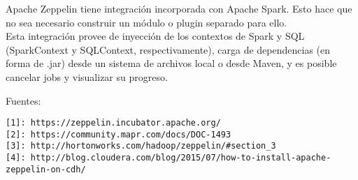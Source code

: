\documentclass[12pt,a4paper,twoside,openright,titlepage,final]{article}
\begin{document}
Apache Zeppelin tiene integración incorporada con Apache Spark. Esto hace que no sea necesario construir un módulo o plugin separado para ello.\\
Esta integración provee de inyección de los contextos de Spark y SQL (SparkContext y SQLContext, respectivamente), carga de dependencias (en forma de .jar) desde un sistema de archivos local o desde Maven, y es posible cancelar jobs y visualizar su progreso. 

Fuentes:\\
\begin{verbatim}
[1]: https://zeppelin.incubator.apache.org/
[2]: https://community.mapr.com/docs/DOC-1493
[3]: http://hortonworks.com/hadoop/zeppelin/#section_3
[4]: http://blog.cloudera.com/blog/2015/07/how-to-install-apache-zeppelin-on-cdh/
\end{verbatim}
\end{document}
